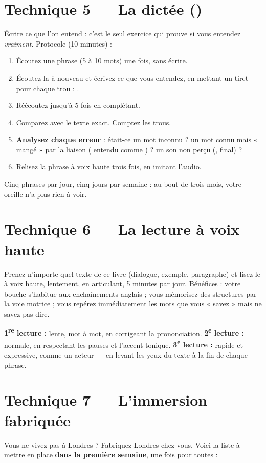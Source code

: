\section{Technique 5 --- La dictée ()}
Écrire ce que l'on entend : c'est le seul exercice qui prouve si vous entendez \emph{vraiment}.
Protocole (10 minutes) :
\begin{enumerate}
  \item Écoutez une phrase (5 à 10 mots) une fois, sans écrire.
  \item Écoutez-la à nouveau et écrivez ce que vous entendez, en mettant un tiret pour chaque
  trou : .
  \item Réécoutez jusqu'à 5 fois en complétant.
  \item Comparez avec le texte exact. Comptez les trous.
  \item \textbf{Analysez chaque erreur} : était-ce un mot inconnu ? un mot connu mais « mangé »
  par la liaison ( entendu comme ) ? un son non perçu (,  final) ?
  \item Relisez la phrase à voix haute trois fois, en imitant l'audio.
\end{enumerate}
Cinq phrases par jour, cinq jours par semaine : au bout de trois mois, votre oreille n'a plus
rien à voir.

\section{Technique 6 --- La lecture à voix haute}
Prenez n'importe quel texte de ce livre (dialogue, exemple, paragraphe) et lisez-le à voix
haute, lentement, en articulant, 5 minutes par jour. Bénéfices : votre bouche s'habitue aux
enchaînements anglais ; vous mémorisez des structures par la voie motrice ; vous repérez
immédiatement les mots que vous « savez » mais ne savez pas dire.

\begin{astuce}
\textbf{1\textsuperscript{re} lecture :} lente, mot à mot, en corrigeant la prononciation.
\textbf{2\textsuperscript{e} lecture :} normale, en respectant les pauses et l'accent tonique.
\textbf{3\textsuperscript{e} lecture :} rapide et expressive, comme un acteur --- en levant
les yeux du texte à la fin de chaque phrase.
\end{astuce}

\section{Technique 7 --- L'immersion fabriquée}
Vous ne vivez pas à Londres ? Fabriquez Londres chez vous. Voici la liste à mettre en place
\textbf{dans la première semaine}, une fois pour toutes :

